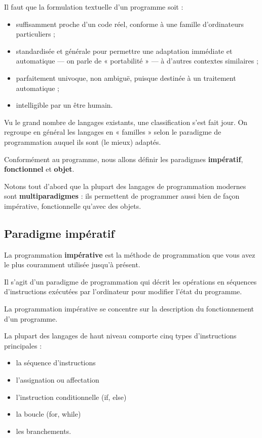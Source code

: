 \documentclass[
  letterpaper,
  DIV=11,
  numbers=noendperiod]{scrartcl}
\providecommand{\tightlist}{%
  \setlength{\itemsep}{0pt}\setlength{\parskip}{0pt}}\usepackage{longtable,booktabs,array}
\begin{document}
Il faut que la formulation textuelle d'un programme soit :

\begin{itemize}
\tightlist
\item
  suffisamment proche d'un code réel, conforme à une famille
  d'ordinateurs particuliers ;
\item
  standardisée et générale pour permettre une adaptation immédiate et
  automatique --- on parle de « portabilité » --- à d'autres contextes
  similaires ;
\item
  parfaitement univoque, non ambiguë, puisque destinée à un traitement
  automatique ;
\item
  intelligible par un être humain.
\end{itemize}

Vu le grand nombre de langages existants, une classification s'est fait
jour. On regroupe en général les langages en « familles » selon le
paradigme de programmation auquel ils sont (le mieux) adaptés.

Conformément au programme, nous allons définir les paradigmes
\textbf{impératif}, \textbf{fonctionnel} et \textbf{objet}.

Notons tout d'abord que la plupart des langages de programmation
modernes sont \textbf{multiparadigmes} : ils permettent de programmer
aussi bien de façon impérative, fonctionnelle qu'avec des objets.

\hypertarget{paradigme-impuxe9ratif}{%
\subsection{Paradigme impératif}\label{paradigme-impuxe9ratif}}

La programmation \textbf{impérative} est la méthode de programmation que
vous avez le plus couramment utilisée jusqu'à présent.

Il s'agit d'un paradigme de programmation qui décrit les opérations en
séquences d'instructions exécutées par l'ordinateur pour modifier l'état
du programme.

La programmation impérative se concentre sur la description du
fonctionnement d'un programme.

La plupart des langages de haut niveau comporte cinq types
d'instructions principales :

\begin{itemize}
\tightlist
\item
  la séquence d'instructions
\item
  l'assignation ou affectation
\item
  l'instruction conditionnelle (if, else)
\item
  la boucle (for, while)
\item
  les branchements.
\end{itemize}
\end{document}
